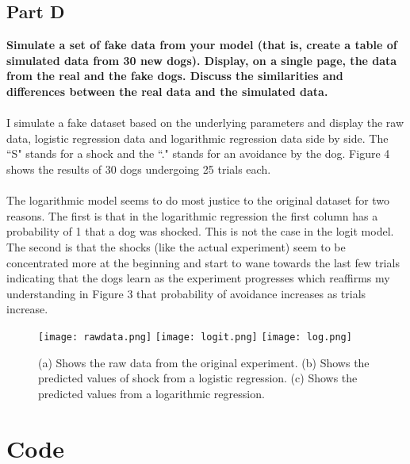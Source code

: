 \documentclass{article}
\begin{document}
\subsection{Part D}
\textbf{Simulate a set of fake data from your model (that is, create a table of simulated data from 30 new dogs). Display, on a single page, the data from the real and the fake dogs. Discuss the similarities and differences between the real data and the simulated data.}\\
\\
I simulate a fake dataset based on the underlying parameters and display the raw data, logistic regression data and logarithmic regression data side by side. The ``S" stands for a shock and the ``." stands for an avoidance by the dog. Figure 4 shows the results of 30 dogs undergoing 25 trials each.\\
\\
The logarithmic model seems to do most justice to the original dataset for two reasons. The first is that in the logarithmic regression the first column has a probability of 1 that a dog was shocked. This is not the case in the logit model. The second is that the shocks (like the actual experiment) seem to be concentrated more at the beginning and start to wane towards the last few trials indicating that the dogs learn as the experiment progresses which reaffirms my understanding in Figure 3 that probability of avoidance increases as trials increase.


\begin{figure}[H]

\centering
\hspace*{-3cm}
\texttt{[image: rawdata.png]}
\texttt{[image: logit.png]}
\texttt{[image: log.png]}
\hspace*{-3cm}

\caption{(a) Shows the raw data from the original experiment. (b) Shows the predicted values of shock from a logistic regression. (c) Shows the predicted values from a logarithmic regression.}
\label{fig:figure3}

\end{figure}
\newpage

\section{Code}
\end{document}
